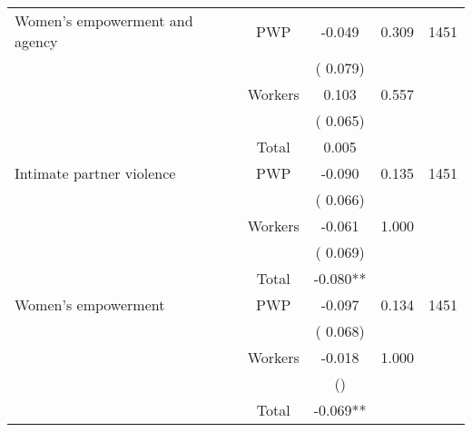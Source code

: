 \begin{tabular}{l*{4}{c}}
\cmidrule{2-3}
 Women's empowerment and agency                &       PWP     &             -0.049               &        0.309   & 1451                              \\ 
                               &                               &       (       0.079)                     & &                                                                             \\ 
                               &       Workers         &              0.103               &        0.557   &                                               \\ 
                               &                               &       (       0.065)                     & &                                                                             \\ 
\cmidrule{2-3}
                               &       Total           &              0.005               &   &                                               \\ 
\cmidrule{2-3}
 Intimate partner violence                &       PWP     &             -0.090               &        0.135   & 1451                              \\ 
                               &                               &       (       0.066)                     & &                                                                             \\ 
                               &       Workers         &             -0.061               &        1.000   &                                               \\ 
                               &                               &       (       0.069)                     & &                                                                             \\ 
\cmidrule{2-3}
                               &       Total           &             -0.080**               &   &                                               \\ 
\cmidrule{2-3}
 Women's empowerment                &       PWP     &             -0.097               &        0.134   & 1451                              \\ 
                               &                               &       (       0.068)                     & &                                                                             \\ 
                               &       Workers         &             -0.018               &        1.000   &                                               \\ 
                               &                               &       ()                     & &                                                                             \\ 
\cmidrule{2-3}
                               &       Total           &             -0.069**               &   &                                               \\ 
\cmidrule{2-3}
\hline \end{tabular}                                                                                                              